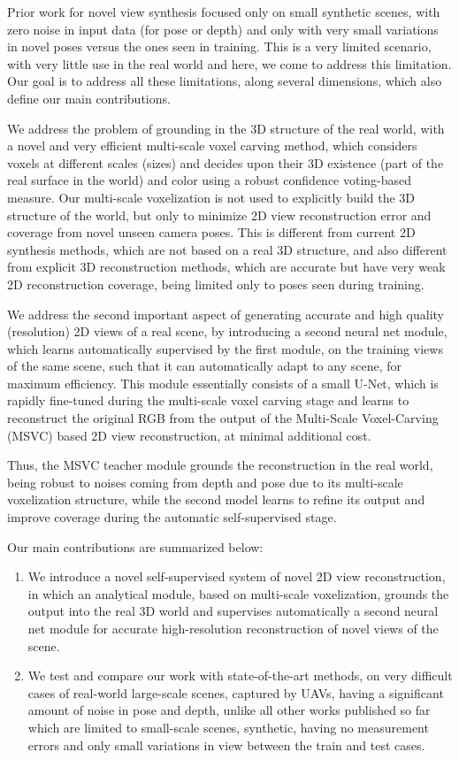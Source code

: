 \documentclass{article}
\begin{document}
Prior work for novel view synthesis focused only on small synthetic scenes, with zero noise in input data (for pose or depth) and only with very small variations in novel poses versus the ones seen in training. This is a very limited scenario, with very little use in the real world and here, we come to address this limitation. Our goal is to address all these limitations, along several dimensions, which also define our main contributions.

We address the problem of grounding in the 3D structure of the real world, with a novel and very efficient multi-scale voxel carving method, which considers voxels at different scales (sizes) and decides upon their 3D existence (part of the real surface in the world) and color using a robust confidence voting-based measure. Our multi-scale voxelization is not used to explicitly build the 3D structure of the world, but only to minimize 2D view reconstruction error and coverage from novel unseen camera poses. This is  different from current 2D synthesis methods, which are not based on a real 3D structure, and also different from explicit 3D reconstruction methods, which are accurate but have very weak 2D reconstruction coverage, being limited only to poses seen during training.

We address the second important aspect of generating accurate and high quality (resolution) 2D views of a real scene, by introducing a second neural net module, which learns automatically supervised by the first module, on the training views of the same scene, such that it can automatically adapt to any scene, for maximum efficiency. This module essentially consists of a small U-Net, which is rapidly fine-tuned during the multi-scale voxel carving stage and learns to reconstruct the original RGB from the output of the Multi-Scale Voxel-Carving (MSVC) based 2D view reconstruction, at minimal additional cost.

Thus, the MSVC teacher module grounds the reconstruction in the real world, being robust to noises coming from depth and pose due to its multi-scale voxelization structure, while the second model learns to refine its output and improve coverage during the automatic self-supervised stage.

Our main contributions are summarized below:

\begin{enumerate}
\item We introduce a novel self-supervised system of novel 2D view reconstruction, in which an analytical module, based on multi-scale voxelization, grounds the output into the real 3D world and supervises automatically a second neural net module for accurate high-resolution reconstruction of novel views of the scene.
\item We test and compare our work with state-of-the-art methods, on very difficult cases of real-world large-scale scenes, captured by UAVs, having a significant amount of noise in pose and depth, unlike all other works published so far which are limited to small-scale scenes, synthetic, having no measurement errors and only small variations in view between the train and test cases.
\end{enumerate}
\end{document}
